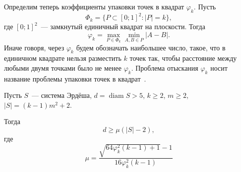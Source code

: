 Определим теперь коэффициенты упаковки точек в квадрат $\varphi_k$.
Пусть
\begin{equation*}
	\Phi_k = \{ P \subset [0;1]^2 : |P|=k\}
	,
\end{equation*}
где $[0;1]^2$~--- замкнутый единичный квадрат на плоскости.
Тогда
\begin{equation*}
	\varphi_k = \max_{P \in \Phi_k} \min_{A,B \in P} |A - B|
	.
\end{equation*}
Иначе говоря, через $\varphi_k$ будем обозначать наибольшее число, такое,
что в единичном квадрате нельзя разместить $k$ точек так,
чтобы расстояние между любыми двумя точками было не менее $\varphi_k$.
Проблема отыскания $\varphi_k$ носит название проблемы упаковки точек в квадрат~\cite{locatelli2002packing,costa2013valid}.


\begin{lemma}
	Пусть $S$~--- система Эрдёша,
	$d = \operatorname{diam} S > 5$,
	$k \geq 2$,
	$m \geq 2$,
	$ |S| = (k-1)m^2 + 2$.

	Тогда
	\begin{equation}
		d \geq \mu (|S| - 2),
	\end{equation}
	где
	\begin{equation}
		\mu = \frac{\sqrt{64\varphi_k^2 (k-1)+1}-1}{16\varphi_k^2 (k-1)}
	\end{equation}
\end{lemma}

